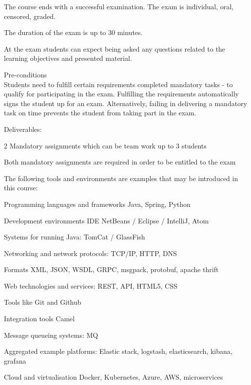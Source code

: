 \documentclass[Screen16to9,17pt]{foils}
\begin{document}

\begin{list2}
\item The course ends with a successful examination. The exam is individual, oral, censored, graded.
\item The duration of the exam is up to 30 minutes.
\item At the exam students can expect being asked any questions related to the learning objectives and presented material.
\end{list2}

Pre-conditions\\
Students need to fulfill certain requirements  completed mandatory tasks - to qualify for participating in the exam.
Fulfilling the requirements automatically signs the student up for an exam. Alternatively, failing in delivering a mandatory
task on time prevents the student from taking part in the exam.

\begin{list2}
\item Deliverables:
\item 2 Mandatory assignments which can be team work up to 3 students
\item Both mandatory assignments are required in order to be entitled to the exam
\end{list2}



The following tools and environments are examples that may be introduced in this course:

\begin{list2}
\item Programming languages and frameworks Java, Spring, Python
\item Development environments IDE NetBeans / Eclipse / IntelliJ, Atom
\item Systems for running Java: TomCat / GlassFish
\item Networking and network protocols: TCP/IP, HTTP, DNS
\item Formats XML, JSON, WSDL, GRPC, msgpack, protobuf, apache thrift
\item Web technologies and services: REST, API, HTML5, CSS
\item Tools like Git and Github
\item Integration tools Camel
\item Message queueing systems: MQ
\item Aggregated example platforms: Elastic stack, logstash, elasticsearch, kibana, grafana
\item Cloud and virtualisation Docker, Kubernetes, Azure, AWS, microservices
\end{list2}
\end{document}
